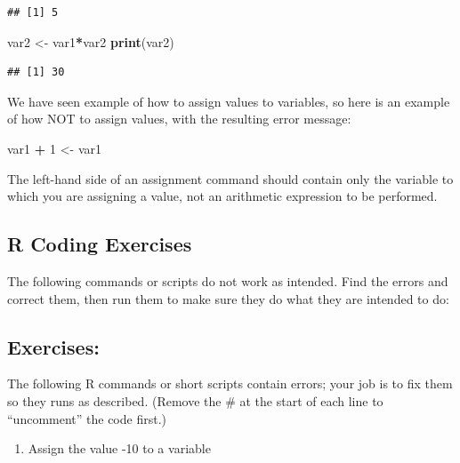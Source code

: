 \documentclass[
]{book}
\newenvironment{Shaded}{\begin{snugshade}}{\end{snugshade}}
\newcommand{\DecValTok}[1]{\textcolor[rgb]{0.00,0.00,0.81}{#1}}
\newcommand{\KeywordTok}[1]{\textcolor[rgb]{0.13,0.29,0.53}{\textbf{#1}}}
\newcommand{\NormalTok}[1]{#1}
\newcommand{\OperatorTok}[1]{\textcolor[rgb]{0.81,0.36,0.00}{\textbf{#1}}}
\newcommand{\StringTok}[1]{\textcolor[rgb]{0.31,0.60,0.02}{#1}}
\providecommand{\tightlist}{%
  \setlength{\itemsep}{0pt}\setlength{\parskip}{0pt}}
\theoremstyle{definition}
\theoremstyle{definition}
\theoremstyle{definition}
\theoremstyle{remark}
\begin{document}
\begin{verbatim}
## [1] 5
\end{verbatim}

\begin{Shaded}
\begin{Highlighting}[]
\NormalTok{var2 \textless{}{-}}\StringTok{ }\NormalTok{var1}\OperatorTok{*}\NormalTok{var2}
\KeywordTok{print}\NormalTok{(var2)}
\end{Highlighting}
\end{Shaded}

\begin{verbatim}
## [1] 30
\end{verbatim}

We have seen example of how to assign values to variables, so here is an example of how NOT to assign values, with the resulting error message:

\begin{Shaded}
\begin{Highlighting}[]
\NormalTok{var1 }\OperatorTok{+}\StringTok{ }\DecValTok{1}\NormalTok{ \textless{}{-}}\StringTok{ }\NormalTok{var1}
\end{Highlighting}
\end{Shaded}

The left-hand side of an assignment command should contain only the variable to which you are assigning a value, not an arithmetic expression to be performed.

\hypertarget{r-coding-exercises-1}{%
\subsection{R Coding Exercises}\label{r-coding-exercises-1}}

The following commands or scripts do not work as intended. Find the errors and correct them, then run them to make sure they do what they are intended to do:

\hypertarget{exercises}{%
\subsection{Exercises:}\label{exercises}}

The following R commands or short scripts contain errors; your job is to fix them so they runs as described. (Remove the \# at the start of each line to ``uncomment'' the code first.)

\begin{enumerate}
\def\labelenumi{\arabic{enumi}.}
\tightlist
\item
  Assign the value -10 to a variable
\end{enumerate}
\end{document}
